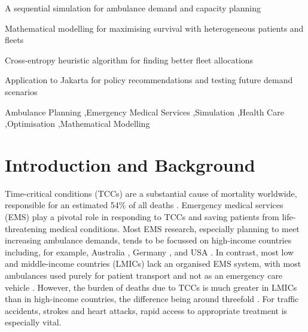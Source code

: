 \documentclass[preprint,12pt]{elsarticle}
\begin{document}
\begin{frontmatter}
\begin{abstract}
\end{abstract}


\begin{highlights}
\item A sequential simulation for ambulance demand and capacity planning
\item Mathematical modelling for maximising survival with heterogeneous patients and fleets
\item Cross-entropy heuristic algorithm for finding better fleet allocations
\item Application to Jakarta for policy recommendations and testing future demand scenarios
\end{highlights}

\begin{keyword}
Ambulance Planning \sep Emergency Medical Services \sep Simulation \sep Health Care \sep Optimisation \sep Mathematical Modelling
\end{keyword}

\end{frontmatter}


\newpage


\section{Introduction and Background}

Time-critical conditions (TCCs) are a substantial cause of mortality worldwide, responsible for an estimated 54\% of all deaths \cite{FraserBMJ}. Emergency medical services (EMS) play a pivotal role in responding to TCCs and saving patients from life-threatening medical conditions. Most EMS research, especially  planning to meet increasing ambulance demands, tends to be focussed on high-income countries including, for example, Australia \cite{lowthian2011increasing}, Germany \cite{veser2015demographic}, and USA \cite{birmingham2021trends}. In contrast, most low and middle-income countries (LMICs) lack an organised EMS system, with most ambulances used purely for patient transport and not as an emergency care vehicle \cite{plummer2017ems}.  However, the burden of deaths due to TCCs is much greater in LMICs than in high-income countries, the difference being around threefold \cite{ChangPMC}. For traffic accidents, strokes and heart attacks, rapid access to appropriate treatment is especially vital. 
\end{document}
